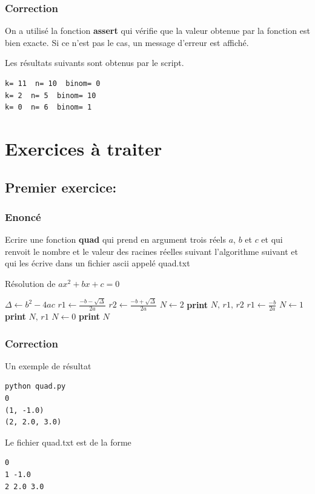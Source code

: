 \documentclass[a4paper,12pt]{article}
\begin{document}
\subsubsection{Correction}
On a utilisé la fonction \textbf{assert} qui vérifie que la valeur obtenue par la fonction est bien exacte. Si ce n'est pas le cas, un message d'erreur est affiché.


Les résultats suivants sont obtenus par le script.
\begin{verbatim}
k= 11  n= 10  binom= 0
k= 2  n= 5  binom= 10
k= 0  n= 6  binom= 1
\end{verbatim}

\clearpage
\section{Exercices \`a traiter}
\subsection{Premier exercice: }
\subsubsection{Enonc\'e}
\begin{leftbar}
Ecrire une fonction \textbf{quad} qui prend en argument trois r\'eels $a$, $b$ et $c$ et qui renvoit le nombre et le valeur des racines r\'eelles suivant l'algorithme suivant et qui les \'ecrive dans un fichier ascii appel\'e quad.txt
\end{leftbar}
\begin{algorithm}
\caption{R\'esolution de $ax^2+bx+c=0$}
\begin{algorithmic}
\State $\Delta\gets b^2-4ac$
    \State $r1\gets \displaystyle\frac{-b-\sqrt{\Delta}}{2a}$
    \State $r2\gets \displaystyle\frac{-b+\sqrt{\Delta}}{2a}$
    \State $N \gets 2$
    \newline \textbf{print} $N,\,r1,\, r2$
        \State $r1\gets  \displaystyle\frac{-b}{2a}$
        \State $N \gets 1$
        \newline \textbf{print} $N,\,r1$
\Else
        \State $N \gets 0$
        \newline \textbf{print} $N$
\EndIf
\end{algorithmic}
\end{algorithm}
\clearpage
\subsubsection{Correction}

Un exemple de r\'esultat
\begin{verbatim}
python quad.py
0
(1, -1.0)
(2, 2.0, 3.0)
\end{verbatim} 
Le fichier quad.txt est de la forme
\begin{verbatim}
0
1 -1.0
2 2.0 3.0
\end{verbatim} 
\end{document}

